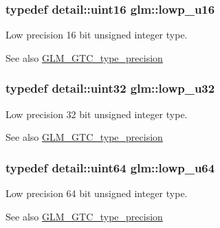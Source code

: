 \subsubsection[{lowp\+\_\+u16}]{\setlength{\rightskip}{0pt plus 5cm}typedef {\bf detail\+::uint16} {\bf glm\+::lowp\+\_\+u16}}\label{group__gtc__type__precision_ga22c5364f27caa0a6eb0627cbc21e46be}
Low precision 16 bit unsigned integer type. \begin{DoxySeeAlso}{See also}
\hyperlink{group__gtc__type__precision}{G\+L\+M\+\_\+\+G\+T\+C\+\_\+type\+\_\+precision} 
\end{DoxySeeAlso}
\hypertarget{group__gtc__type__precision_gaba06fae1dd98ca50c017e68345df0365}{}
\subsubsection[{lowp\+\_\+u32}]{\setlength{\rightskip}{0pt plus 5cm}typedef {\bf detail\+::uint32} {\bf glm\+::lowp\+\_\+u32}}\label{group__gtc__type__precision_gaba06fae1dd98ca50c017e68345df0365}
Low precision 32 bit unsigned integer type. \begin{DoxySeeAlso}{See also}
\hyperlink{group__gtc__type__precision}{G\+L\+M\+\_\+\+G\+T\+C\+\_\+type\+\_\+precision} 
\end{DoxySeeAlso}
\hypertarget{group__gtc__type__precision_ga61ed4c68a4cffb77cd63cc107119123a}{}
\subsubsection[{lowp\+\_\+u64}]{\setlength{\rightskip}{0pt plus 5cm}typedef detail\+::uint64 {\bf glm\+::lowp\+\_\+u64}}\label{group__gtc__type__precision_ga61ed4c68a4cffb77cd63cc107119123a}
Low precision 64 bit unsigned integer type. \begin{DoxySeeAlso}{See also}
\hyperlink{group__gtc__type__precision}{G\+L\+M\+\_\+\+G\+T\+C\+\_\+type\+\_\+precision} 
\end{DoxySeeAlso}
\hypertarget{group__gtc__type__precision_gae63f942c49a30dbf266b2f13f3efe257}{}
